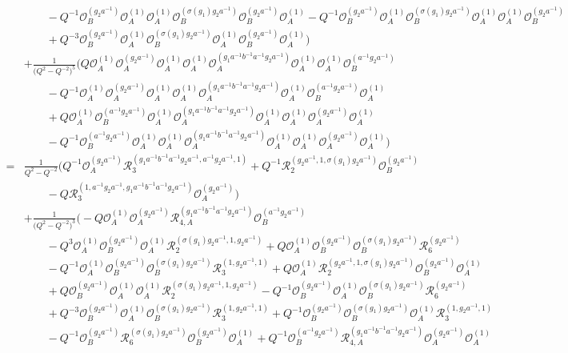 \documentclass{amsart}
\newcommand{\Oa}{\mathcal O_A}
\newcommand{\Ob}{\mathcal O_B}
\newcommand{\R}{\mathcal R}
\begin{document}
\begin{align*}
&\qquad-Q^{-1}\Ob^{(g_2a^{-1})}\Oa^{(1)}\Oa^{(1)}\Ob^{(\sigma(g_1)g_2a^{-1})}\Ob^{(g_2a^{-1})}\Oa^{(1)}-Q^{-1}\Ob^{(g_2a^{-1})}\Oa^{(1)}\Ob^{(\sigma(g_1)g_2a^{-1})}\Oa^{(1)}\Oa^{(1)}\Ob^{(g_2a^{-1})}\\
&\qquad+Q^{-3}\Ob^{(g_2a^{-1})}\Oa^{(1)}\Ob^{(\sigma(g_1)g_2a^{-1})}\Oa^{(1)}\Ob^{(g_2a^{-1})}\Oa^{(1)}\Big)\\
&+\frac1{\big(Q^2-Q^{-2}\big)^5}\Big(Q\Oa^{(1)}\Oa^{(g_2a^{-1})}\Oa^{(1)}\Oa^{(1)}\Oa^{(g_1a^{-1}b^{-1}a^{-1}g_2a^{-1})}\Oa^{(1)}\Oa^{(1)}\Ob^{(a^{-1}g_2a^{-1})}\\
&\qquad-Q^{-1}\Oa^{(1)}\Oa^{(g_2a^{-1})}\Oa^{(1)}\Oa^{(1)}\Oa^{(g_1a^{-1}b^{-1}a^{-1}g_2a^{-1})}\Oa^{(1)}\Ob^{(a^{-1}g_2a^{-1})}\Oa^{(1)}\\
&\qquad+Q\Oa^{(1)}\Ob^{(a^{-1}g_2a^{-1})}\Oa^{(1)}\Oa^{(g_1a^{-1}b^{-1}a^{-1}g_2a^{-1})}\Oa^{(1)}\Oa^{(1)}\Oa^{(g_2a^{-1})}\Oa^{(1)}\\
&\qquad-Q^{-1}\Ob^{(a^{-1}g_2a^{-1})}\Oa^{(1)}\Oa^{(1)}\Oa^{(g_1a^{-1}b^{-1}a^{-1}g_2a^{-1})}\Oa^{(1)}\Oa^{(1)}\Oa^{(g_2a^{-1})}\Oa^{(1)}\Big)\\
=&\frac1{Q^2-Q^{-2}}\Big(Q^{-1}\Oa^{(g_2a^{-1})}\R_{3}^{(g_1a^{-1}b^{-1}a^{-1}g_2a^{-1},a^{-1}g_2a^{-1},1)}+Q^{-1}\R_{2}^{(g_2a^{-1},1,\sigma(g_1)g_2a^{-1})}\Ob^{(g_2a^{-1})}\\
&\qquad-Q\R_{3}^{(1,a^{-1}g_2a^{-1},g_1a^{-1}b^{-1}a^{-1}g_2a^{-1})}\Oa^{(g_2a^{-1})}\Big)\\
&+\frac1{\big(Q^2-Q^{-2}\big)^3}\Big(-Q\Oa^{(1)}\Oa^{(g_2a^{-1})}\R_{4,A}^{(g_1a^{-1}b^{-1}a^{-1}g_2a^{-1})}\Ob^{(a^{-1}g_2a^{-1})}\\
&\qquad-Q^3\Oa^{(1)}\Ob^{(g_2a^{-1})}\Oa^{(1)}\R_{2}^{(\sigma(g_1)g_2a^{-1},1,g_2a^{-1})}+Q\Oa^{(1)}\Ob^{(g_2a^{-1})}\Ob^{(\sigma(g_1)g_2a^{-1})}\R_{6}^{(g_2a^{-1})}\\
&\qquad-Q^{-1}\Oa^{(1)}\Ob^{(g_2a^{-1})}\Ob^{(\sigma(g_1)g_2a^{-1})}\R_{3}^{(1,g_2a^{-1},1)}+Q\Oa^{(1)}\R_{2}^{(g_2a^{-1},1,\sigma(g_1)g_2a^{-1})}\Ob^{(g_2a^{-1})}\Oa^{(1)}\\
&\qquad+Q\Ob^{(g_2a^{-1})}\Oa^{(1)}\Oa^{(1)}\R_{2}^{(\sigma(g_1)g_2a^{-1},1,g_2a^{-1})}-Q^{-1}\Ob^{(g_2a^{-1})}\Oa^{(1)}\Ob^{(\sigma(g_1)g_2a^{-1})}\R_{6}^{(g_2a^{-1})}\\
&\qquad+Q^{-3}\Ob^{(g_2a^{-1})}\Oa^{(1)}\Ob^{(\sigma(g_1)g_2a^{-1})}\R_{3}^{(1,g_2a^{-1},1)}+Q^{-1}\Ob^{(g_2a^{-1})}\Ob^{(\sigma(g_1)g_2a^{-1})}\Oa^{(1)}\R_{3}^{(1,g_2a^{-1},1)}\\
&\qquad-Q^{-1}\Ob^{(g_2a^{-1})}\R_{6}^{(\sigma(g_1)g_2a^{-1})}\Ob^{(g_2a^{-1})}\Oa^{(1)}+Q^{-1}\Ob^{(a^{-1}g_2a^{-1})}\R_{4,A}^{(g_1a^{-1}b^{-1}a^{-1}g_2a^{-1})}\Oa^{(g_2a^{-1})}\Oa^{(1)}\\

\end{align*}
\end{document}
